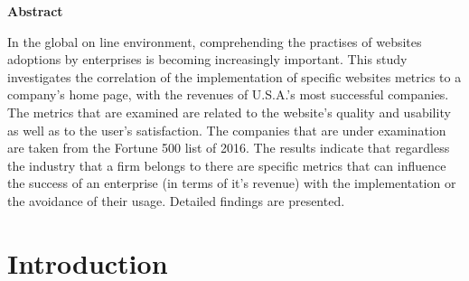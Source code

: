 \documentclass{article}
\begin{document}
\newpage
\begin{center}
\textbf{Abstract}
\end{center}
In the global on line environment, comprehending the practises of websites adoptions by enterprises is becoming increasingly important. This study investigates the correlation of the implementation of specific websites metrics to a company's home page, with the revenues of U.S.A.'s most successful companies. The metrics that are examined are related to the website's quality and usability as well as to the user's satisfaction. The companies that are under examination are taken from the Fortune 500 list of 2016. The results indicate that regardless the industry that a firm belongs to there are specific metrics that can influence the success of an enterprise (in terms of it's revenue) with the implementation or the avoidance of their usage. Detailed findings are presented.
\newpage
\tableofcontents
\newpage
\section{Introduction}
\end{document}
